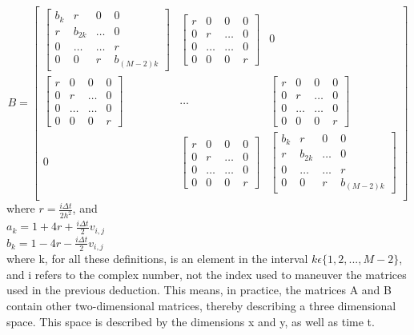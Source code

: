 \documentclass[10pt, nofootinbib, twocolumn]{revtex4-1}
\begin{document}
\[
B = 
\begin{bmatrix}
    \begin{bmatrix}     b_{k} & r & 0 & 0 \\     r & b_{2k} & \ldots & 0 \\     0 & \ldots & \ldots & r \\     0 & 0 & r & b_{(M-2)k} \end{bmatrix} &  \begin{bmatrix}     r & 0 & 0 & 0 \\     0 & r & \ldots & 0 \\     0 & \ldots & \ldots & 0 \\     0 & 0 & 0 &r \end{bmatrix} & 0\\
    \begin{bmatrix}     r & 0 & 0 & 0 \\     0 & r & \ldots & 0 \\     0 & \ldots & \ldots & 0 \\     0 & 0 & 0 &r \end{bmatrix}  & \ldots & \begin{bmatrix}     r & 0 & 0 & 0 \\     0 & r & \ldots & 0 \\     0 & \ldots & \ldots & 0 \\     0 & 0 & 0 &r \end{bmatrix}  \\
    0 &    \begin{bmatrix}     r & 0 & 0 & 0 \\     0 & r & \ldots & 0 \\     0 & \ldots & \ldots & 0 \\     0 & 0 & 0 &r \end{bmatrix} & \begin{bmatrix}     b_{k} & r & 0 & 0 \\     r & b_{2k} & \ldots & 0 \\     0 & \ldots & \ldots & r \\     0 & 0 & r & b_{(M-2)k} \end{bmatrix}  \\
\end{bmatrix}
\]
where $r = \frac{i \Delta t}{2 h^2}$, and \\
\( a_k = 1 + 4r + \frac{i \Delta t}{2} v_{i,j} \) \\ 
\( b_k = 1 - 4r - \frac{i \Delta t}{2} v_{i,j} \) \\

where k, for all these definitions, is an element in the interval $k\epsilon \{1,2,...,M-2\}$, and i refers to the complex number, not the index used to maneuver the matrices used in the previous deduction. This means, in practice, the matrices A and B contain other two-dimensional matrices, thereby describing a three dimensional space. This space is described by the dimensions x and y, as well as time t. \\
\end{document}
